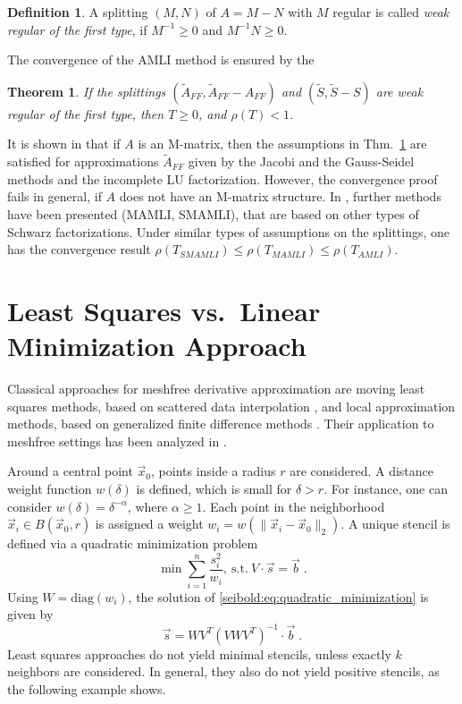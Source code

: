 \documentclass[reqno]{amsart}
\theoremstyle{plain}
\newtheorem{thm}{Theorem}
\theoremstyle{definition}
\newtheorem{defn}{Definition}
\theoremstyle{remark}
\begin{document}
\begin{defn}
A splitting $(M,N)$ of $A = M-N$ with $M$ regular is called
\emph{weak regular of the first type}, if $M^{-1}\ge 0$ and $M^{-1}N\ge 0$.
\end{defn}
The convergence of the AMLI method is ensured by the
\begin{thm}
\label{seibold:thm:AMLI_convergence}
If the splittings
${\left({\tilde{A}_{FF},\tilde{A}_{FF}-A_{FF}}\right)}$ and ${\left({\tilde{S},\tilde{S}-S}\right)}$
are weak regular of the first type,
then $T\ge 0$, and $\rho(T)<1$.
\end{thm}
It is shown in \cite{MenseNabben2008_2} that if $A$ is an M-matrix, then the assumptions
in Thm.~\ref{seibold:thm:AMLI_convergence} are satisfied for approximations $\tilde{A}_{FF}$
given by the Jacobi and the Gauss-Seidel methods and the incomplete LU factorization.
However, the convergence proof fails in general, if $A$ does not have an M-matrix
structure.
In \cite{MenseNabben2008_2}, further methods have been presented (MAMLI, SMAMLI), that
are based on other types of Schwarz factorizations. Under similar types of assumptions
on the splittings, one has the convergence result
$\rho(T_{SMAMLI})\le\rho(T_{MAMLI})\le\rho(T_{AMLI})$.

\section{Least Squares vs.~Linear Minimization Approach}
\label{seibold:sec:least_squares_vs_linear_minimization}
Classical approaches for meshfree derivative approximation are moving least squares
methods, based on scattered data interpolation \cite{LancasterSalkauskas1981},
and local approximation methods, based on generalized finite difference
methods \cite{LiszkaOrkisz1980}. Their application to meshfree settings has
been analyzed in \cite{DuarteLiszkaTworzyako1996,Levin1998}.

Around a central point $\vec{x}_0$, points inside a radius $r$ are considered.
A distance weight function $w(\delta)$ is defined, which is small for $\delta>r$.
For instance, one can consider $w(\delta)=\delta^{-\alpha}$, where $\alpha\ge 1$.
Each point in the neighborhood $\vec{x}_i\in B(\vec{x}_0,r)$ is assigned a weight
$w_i = w{\left({\|\vec{x}_i-\vec{x}_0\|_2}\right)}$. A unique stencil is defined via a quadratic
minimization problem
\begin{equation}
\min\sum_{i=1}^n\frac{s_i^2}{w_i}, \ \mathrm{s.t.} \
V\cdot\vec{s} = \vec{b}\;.
\label{seibold:eq:quadratic_minimization}
\end{equation}
Using $W=\mathrm{diag}(w_i)$, the solution of \eqref{seibold:eq:quadratic_minimization}
is given by
\begin{equation}
\vec{s} = WV^T(VWV^T)^{-1}\cdot\vec{b}\;.
\label{seibold:eq:stencil_lsq}
\end{equation}
Least squares approaches do not yield minimal stencils, unless exactly $k$ neighbors
are considered. In general, they also do not yield positive stencils, as the following
example shows.
\end{document}
